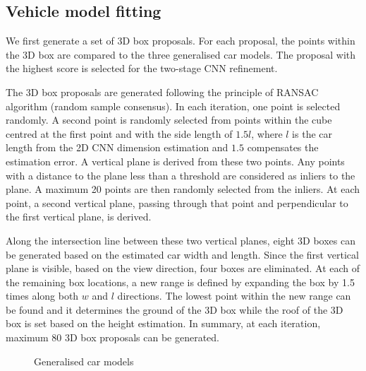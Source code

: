 \documentclass[letterpaper, 10 pt, conference]{ieeeconf}  \usepackage[
\begin{document}
\subsection{Vehicle model fitting}
We first generate a set of 3D box proposals. For each proposal, the points within the 3D box are compared to the three generalised car models. The proposal with the highest score is selected for the two-stage CNN refinement.

The 3D box proposals are generated following the principle of RANSAC algorithm (random sample consensus). In each iteration, one point is selected randomly. A second point is randomly selected from points within the cube centred at the first point and with the side length of $1.5l$, where $l$ is the car length from the 2D CNN dimension estimation and $1.5$ compensates the estimation error. A vertical plane is derived from these two points. Any points with a distance to the plane less than a threshold are considered as inliers to the plane. A maximum 20 points are then randomly selected from the inliers. At each point, a second vertical plane, passing through that point and perpendicular to the first vertical plane, is derived. 

Along the intersection line between these two vertical planes, eight 3D boxes can be generated based on the estimated car width and length. Since the first vertical plane is visible, based on the view direction, four boxes are eliminated. At each of the remaining box locations, a new range is defined by expanding the box by 1.5 times along both $w$ and $l$ directions. The lowest point within the new range can be found and it determines the ground of the 3D box while the roof of the 3D box is set based on the height estimation. In summary, at each iteration, maximum 80 3D box proposals can be generated.

\begin{figure}[h]
\centering
    \caption{Generalised car models}
    \label{fig:Generalised car models}
\end{figure}
\end{document}
